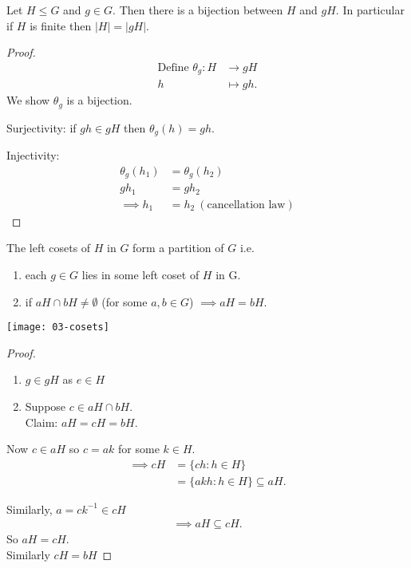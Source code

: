 \begin{lemma}
\protect\hypertarget{lem:nine}{}\label{lem:nine}Let \(H \leq G\) and \(g \in G\).
Then there is a bijection between \(H\) and \(gH\).
In particular if \(H\) is finite then \(|H| = |gH|\).
\end{lemma}

\begin{proof}
\begin{align*}
    \text{Define } \theta_g : H &\to gH \\
    h &\mapsto gh.
\end{align*}
We show \(\theta_g\) is a bijection.

Surjectivity: if \(gh \in gH\) then \(\theta_g(h) = gh\).

Injectivity: \begin{align*}
    \theta_g(h_1) &= \theta_g(h_2) \\
    g h_1 &= g h_2 \\
    \implies h_1 &= h_2 \ (\text{cancellation law})
\end{align*}
\end{proof}

\begin{lemma}
\protect\hypertarget{lem:ten}{}\label{lem:ten}

    The left cosets of \(H\) in \(G\) form a partition of \(G\) i.e.

    \begin{enumerate}
    \def\labelenumi{\roman{enumi}.}
    \item
    each \(g \in G\) lies in some left coset of \(H\) in G.
    \item
    if \(aH \cap bH \neq \emptyset\) (for some \(a, b \in G\)) \(\implies aH = bH\).
    \end{enumerate}

    {\centering \texttt{[image: 03-cosets]} }
\end{lemma}

\begin{proof} \mbox{}
    \begin{enumerate}
    \def\labelenumi{\roman{enumi}.}
        \item
        \(g \in gH\) as \(e \in H\)
        \item
        Suppose \(c \in aH \cap bH\).\\
        Claim: \(aH = cH = bH\).
    \end{enumerate}

    Now \(c \in aH\) so \(c = ak\) for some \(k \in H\).
    \begin{align*}
        \implies cH &= \{ c h : h \in H \} \\
        &= \{ a k h : h \in H \} \subseteq aH.
    \end{align*}

    Similarly, \(a = c k^{-1} \in cH\)
    \begin{align*}
        \implies aH \subseteq cH.
    \end{align*}
    So \(aH = cH\).\\
    Similarly \(cH = bH\)
\end{proof}

